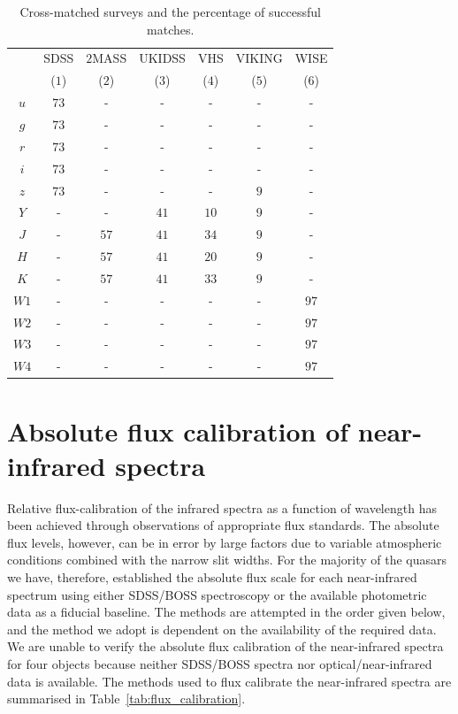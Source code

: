 \begin{table}
  \centering
  \footnotesize 
    \begin{tabular}{ccccccc} 
    \hline
     & SDSS & $2$MASS & UKIDSS & VHS & VIKING & WISE \\
     & ($1$) & ($2$) & ($3$) & ($4$) & ($5$) & ($6$) \\ 
    \hline
    $u$ & $73$ & - & - & - & - & - \\
    $g$ & $73$ & - & - & - & - & - \\
    $r$ & $73$ & - & - & - & - & - \\
    $i$ & $73$ & - & - & - & - & - \\
    $z$ & $73$ & - & - & - & $9$ & - \\
    $Y$ & - & - & $41$ & $10$ & 9 & - \\
    $J$ & - & $57$ & $41$ & $34$ & $9$ & - \\
    $H$ & - & $57$ & $41$ & $20$ & $9$ & - \\
    $K$ & - & $57$ & $41$ & $33$ & $9$ & - \\
    $W1$ & - & - & - & - & - & $97$ \\
    $W2$ & - & - & - & - & - & $97$ \\
    $W3$ & - & - & - & - & - & $97$ \\
    $W4$ & - & - & - & - & - & $97$ \\
    \hline
    \end{tabular}
    \caption[{Cross-matched surveys and the percentage of successful matches.}]{Cross-matched surveys and the percentage of successful matches.}
  \label{tab:cross-matching}
\end{table} 

\section[Absolute flux calibration]{Absolute flux calibration of near-infrared spectra}

Relative flux-calibration of the infrared spectra as a function of wavelength has been achieved through observations of appropriate flux standards. 
The absolute flux levels, however, can be in error by large factors due to variable atmospheric conditions combined with the narrow slit widths. 
For the majority of the quasars we have, therefore, established the absolute flux scale for each near-infrared spectrum using either SDSS/BOSS spectroscopy or the available photometric data as a fiducial baseline.
The methods are attempted in the order given below, and the method we adopt is dependent on the availability of the required data. 
We are unable to verify the absolute flux calibration of the near-infrared spectra for four objects because neither SDSS/BOSS spectra nor optical/near-infrared data is available. 
The methods used to flux calibrate the near-infrared spectra are summarised in Table~\ref{tab:flux_calibration}. 

